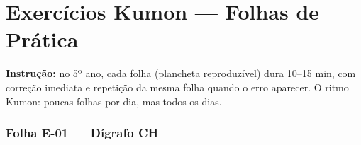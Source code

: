 
\chapter{Exercícios Kumon --- Folhas de Prática}

\textbf{Instrução:} no 5º ano, cada folha (plancheta reproduzível) dura 10–15 min, com correção imediata e repetição da mesma folha quando o erro aparecer. O ritmo Kumon: poucas folhas por dia, mas todos os dias.



\subsection{Folha E-01 --- Dígrafo CH}

